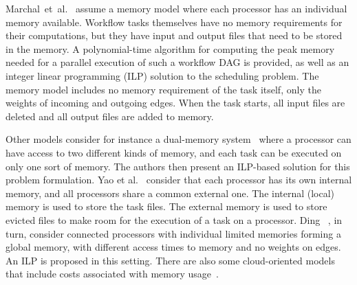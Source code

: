\documentclass[conference]{IEEEtran}
\newcommand{\new}[1]{{#1}}
\begin{document}
Marchal~et~al.~\cite{marchal2018parallel} assume a memory model where each processor has an individual memory available.
\new{Workflow tasks themselves have no memory requirements for their computations,
but they have input and output files that need to be stored in the memory.}
A polynomial-time algorithm for computing the peak memory needed for a parallel execution of such a workflow DAG is provided,
as well as an integer linear programming (ILP) solution to the scheduling problem.
The memory model \new{ includes no memory requirement of the task itself, only the weights of incoming and outgoing edges.
When the task starts, all input files are deleted  and all output files are added to memory.}


Other models consider for instance a 
dual-memory system~\cite{herrmann2014memory} where a processor can have access 
to two different kinds of memory, and each task can be executed on only one sort of memory.
The authors then present an ILP-based solution for this problem formulation.
%
Yao et al.~\cite{yao2022memory} consider that each processor has its own internal memory, and all
processors share a common external one. The internal (local) memory is used to store the task files.
The external memory is used to store evicted files to make room for the execution of a task on a processor.
%
Ding \etal~\cite{ding2024ils}, in turn, consider connected processors with individual limited memories
forming a global memory, with different access times to memory and no weights on edges. An ILP
is proposed in this setting. 
%
%
There are also some cloud-oriented models that include costs associated with memory usage~\cite{liang2020memory}.
\end{document}
